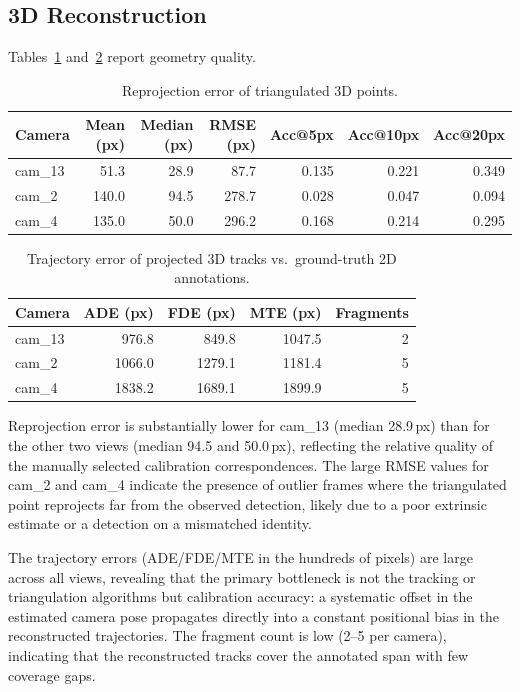 \subsection{3D Reconstruction}

Tables~\ref{tab:reprojection} and~\ref{tab:trajectory} report geometry quality.

\begin{table}[t]
\centering
\caption{Reprojection error of triangulated 3D points.}
\label{tab:reprojection}
\small
\begin{tabular}{lrrrrrr}
\toprule
Camera & Mean (px) & Median (px) & RMSE (px) & Acc@5px & Acc@10px & Acc@20px \\
\midrule
cam\_13 &  51.3 & 28.9 &  87.7 & 0.135 & 0.221 & 0.349 \\
cam\_2  & 140.0 & 94.5 & 278.7 & 0.028 & 0.047 & 0.094 \\
cam\_4  & 135.0 & 50.0 & 296.2 & 0.168 & 0.214 & 0.295 \\
\bottomrule
\end{tabular}
\end{table}

\begin{table}[t]
\centering
\caption{Trajectory error of projected 3D tracks vs.\ ground-truth 2D annotations.}
\label{tab:trajectory}
\small
\begin{tabular}{lrrrr}
\toprule
Camera & ADE (px) & FDE (px) & MTE (px) & Fragments \\
\midrule
cam\_13 &  976.8 &  849.8 & 1047.5 & 2 \\
cam\_2  & 1066.0 & 1279.1 & 1181.4 & 5 \\
cam\_4  & 1838.2 & 1689.1 & 1899.9 & 5 \\
\bottomrule
\end{tabular}
\end{table}

Reprojection error is substantially lower for cam\_13 (median 28.9\,px) than for
the other two views (median 94.5 and 50.0\,px), reflecting the relative quality of
the manually selected calibration correspondences.
The large RMSE values for cam\_2 and cam\_4 indicate the presence of outlier frames
where the triangulated point reprojects far from the observed detection, likely due
to a poor extrinsic estimate or a detection on a mismatched identity.

The trajectory errors (ADE/FDE/MTE in the hundreds of pixels) are large across all
views, revealing that the primary bottleneck is not the tracking or triangulation
algorithms but calibration accuracy: a systematic offset in the estimated camera
pose propagates directly into a constant positional bias in the reconstructed
trajectories.
The fragment count is low (2--5 per camera), indicating that the reconstructed
tracks cover the annotated span with few coverage gaps.

